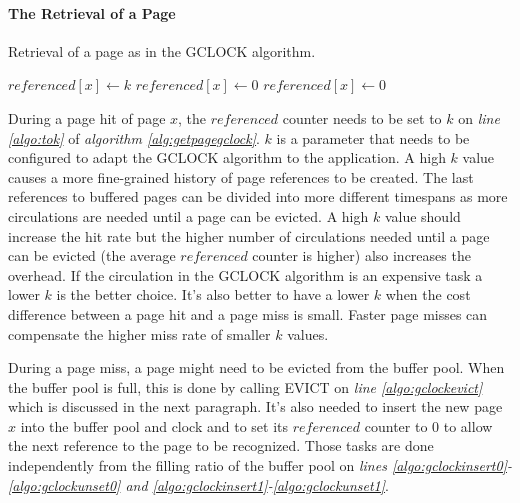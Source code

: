 \paragraph{The Retrieval of a Page}

\begin{@empty}
    \begin{algorithm}[ht!]
        \caption{Retrieval of a page as in the GCLOCK algorithm.}
        \label{alg:getpagegclock}
        \begin{algorithmic}[1]
                    \State $referenced\left[x\right] \gets k$	\label{algo:tok}
                    \State {}	\label{algo:gclockevict}
                    \State {}	\label{algo:gclockinsert0}
                    \State $referenced\left[x\right] \gets 0$	\label{algo:gclockunset0}
                \Else
                    \State {}	\label{algo:gclockinsert1}
                    \State $referenced\left[x\right] \gets 0$	\label{algo:gclockunset1}
                \EndIf
            \EndProcedure
        \end{algorithmic}
    \end{algorithm}
\end{@empty}

    During a page hit of page $x$, the $referenced$ counter needs to be set to $k$ on \emph{line \ref{algo:tok}} of \emph{algorithm \ref{alg:getpagegclock}}. $k$ is a parameter that needs to be configured to adapt the GCLOCK algorithm to the application. A high $k$ value causes a more fine-grained history of page references to be created. The last references to buffered pages can be divided into more different timespans as more circulations are needed until a page can be evicted. A high $k$ value should increase the hit rate but the higher number of circulations needed until a page can be evicted (the average $referenced$ counter is higher) also increases the overhead. If the circulation in the GCLOCK algorithm is an expensive task a lower $k$ is the better choice. It's also better to have a lower $k$ when the cost difference between a page hit and a page miss is small. Faster page misses can compensate the higher miss rate of smaller $k$ values.

    During a page miss, a page might need to be evicted from the buffer pool. When the buffer pool is full, this is done by calling EVICT on \emph{line \ref{algo:gclockevict}} which is discussed in the next paragraph. It's also needed to insert the new page $x$ into the buffer pool and clock and to set its $referenced$ counter to $0$ to allow the next reference to the page to be recognized. Those tasks are done independently from the filling ratio of the buffer pool on \emph{lines \ref{algo:gclockinsert0}-\ref{algo:gclockunset0} and \ref{algo:gclockinsert1}-\ref{algo:gclockunset1}}.

